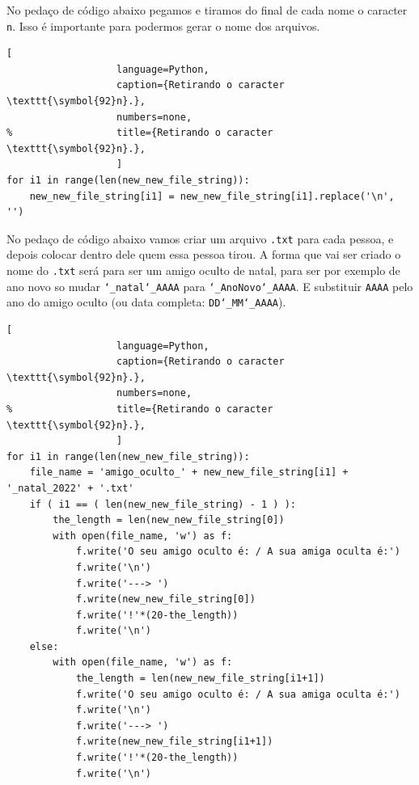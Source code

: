 No pedaço de código abaixo pegamos e tiramos do final de cada nome o caracter \texttt{n}.
Isso é importante para podermos gerar o nome dos arquivos.

\begin{lstlisting}[
				   language=Python,
				   caption={Retirando o caracter \texttt{\symbol{92}n}.},
				   numbers=none,
%				   title={Retirando o caracter \texttt{\symbol{92}n}.},
				   ]
for i1 in range(len(new_new_file_string)):
    new_new_file_string[i1] = new_new_file_string[i1].replace('\n', '')
\end{lstlisting}

No pedaço de código abaixo vamos criar um arquivo \texttt{.txt} para cada pessoa, e depois colocar dentro dele quem essa pessoa tirou.
A forma que vai ser criado o nome do \texttt{.txt} será para ser um amigo oculto de natal, para ser por exemplo de ano novo so mudar \texttt{\char`_natal\char`_AAAA} para \texttt{\char`_AnoNovo\char`_AAAA}.
E substituir \texttt{AAAA} pelo ano do amigo oculto (ou data completa: \texttt{DD\char`_MM\char`_AAAA}).


\begin{lstlisting}[
				   language=Python,
				   caption={Retirando o caracter \texttt{\symbol{92}n}.},
				   numbers=none,
%				   title={Retirando o caracter \texttt{\symbol{92}n}.},
				   ]
for i1 in range(len(new_new_file_string)):
    file_name = 'amigo_oculto_' + new_new_file_string[i1] + '_natal_2022' + '.txt'
    if ( i1 == ( len(new_new_file_string) - 1 ) ):
        the_length = len(new_new_file_string[0])
        with open(file_name, 'w') as f:
            f.write('O seu amigo oculto é: / A sua amiga oculta é:')
            f.write('\n')
            f.write('---> ')
            f.write(new_new_file_string[0])
            f.write('!'*(20-the_length))
            f.write('\n')
    else:
        with open(file_name, 'w') as f:
            the_length = len(new_new_file_string[i1+1])
            f.write('O seu amigo oculto é: / A sua amiga oculta é:')
            f.write('\n')
            f.write('---> ')
            f.write(new_new_file_string[i1+1])
            f.write('!'*(20-the_length))
            f.write('\n')
\end{lstlisting}

